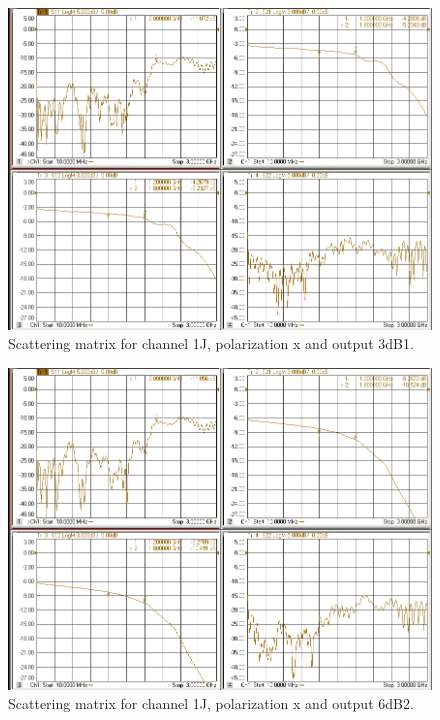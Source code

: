 \documentclass[12pt,a4paper,oneside]{article}
\begin{document}
\begin{figure}[H]
\centering
\includegraphics[width=0.9\linewidth]{VNA_results/1Jx_3dB1.png}
\caption{Scattering matrix for channel 1J, polarization x and output 3dB1.}
\label{fig:1Jx_3dB1}
\end{figure}


\begin{figure}[H]
\centering
\includegraphics[width=0.9\linewidth]{VNA_results/1Jx_6dB2.png}
\caption{Scattering matrix for channel 1J, polarization x and output 6dB2.}
\label{fig:1Jx_6dB2}
\end{figure}
\end{document}

